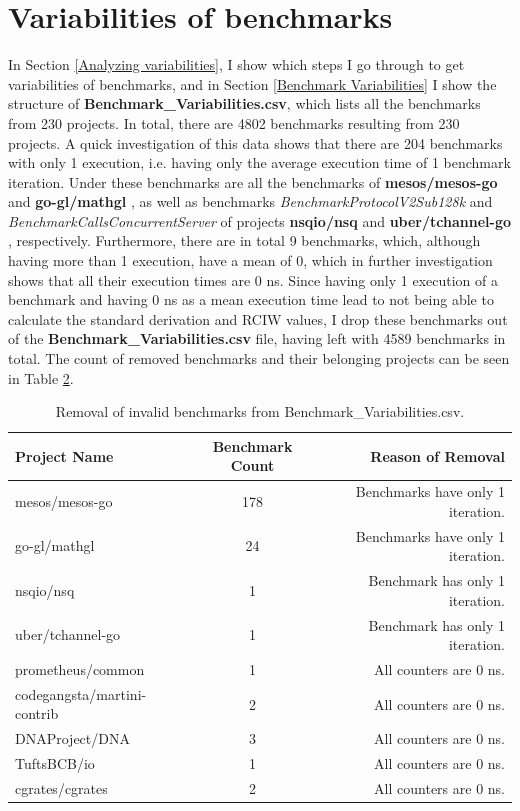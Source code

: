 \documentclass{seal_thesis}
\begin{document}
\section{Variabilities of benchmarks}
\label{Variabilities of benchmarks}

In Section \ref{Analyzing variabilities}, I show which steps I go through to get variabilities of benchmarks, and in Section \ref{Benchmark Variabilities} I show the structure of \textbf{Benchmark\_Variabilities.csv}, which lists all the benchmarks from 230 projects. In total, there are 4802 benchmarks resulting from 230 projects. A quick investigation of this data shows that there are 204 benchmarks with only 1 execution, i.e. having only the average execution time of 1 benchmark iteration. Under these benchmarks are all the benchmarks of \textbf{mesos/mesos-go} \cite{mesos/mesos-go} and \textbf{go-gl/mathgl} \cite{go-gl/mathgl}, as well as benchmarks \textit{BenchmarkProtocolV2Sub128k} and \textit{BenchmarkCallsConcurrentServer} of projects \textbf{nsqio/nsq} \cite{nsqio/nsq} and \textbf{uber/tchannel-go} \cite{uber/tchannel-go}, respectively. Furthermore, there are in total 9 benchmarks, which, although having more than 1 execution, have a mean of 0, which in further investigation shows that all their execution times are 0 ns. Since having only 1 execution of a benchmark and having 0 ns as a mean execution time lead to not being able to calculate the standard derivation and RCIW values, I drop these benchmarks out of the \textbf{Benchmark\_Variabilities.csv} file, having left with 4589 benchmarks in total. The count of removed benchmarks and their belonging projects can be seen in Table \ref{removal1}.

\begin{table}[H]
\begin{longtable}[c]{@{}lcr@{}}
	\caption{Removal of invalid benchmarks from Benchmark\_Variabilities.csv.}
	\label{removal1}\\
	\toprule
	Project Name & Benchmark Count & Reason of Removal \\* \midrule
	\endfirsthead
	\endhead
	\bottomrule
	\endfoot
	\endlastfoot
	mesos/mesos-go & 178 & Benchmarks have only 1 iteration. \\
	go-gl/mathgl & 24 & Benchmarks have only 1 iteration. \\
	nsqio/nsq & 1 & Benchmark has only 1 iteration. \\
	uber/tchannel-go & 1 & Benchmark has only 1 iteration. \\
	prometheus/common & 1 & All counters are 0 ns. \\
	codegangsta/martini-contrib & 2 & All counters are 0 ns. \\
	DNAProject/DNA & 3 & All counters are 0 ns. \\
	TuftsBCB/io & 1 & All counters are 0 ns. \\
	cgrates/cgrates & 2 & All counters are 0 ns. \\* \bottomrule
\end{longtable}
\end{table}
\end{document}
